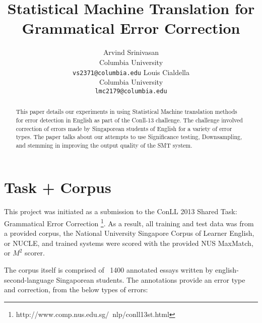 \documentclass[11pt,letterpaper]{article}
\title{Statistical Machine Translation for Grammatical Error Correction}
\author{Arvind Srinivasan\\
	    Columbia University\\
	    {\tt vs2371@columbia.edu}
	  \And
	Louis Cialdella\\
  	Columbia University\\
  {\tt lmc2179@columbia.edu}}
\date{}
\begin{document}
\maketitle
\begin{abstract}
This paper details our experiments in using Statistical Machine translation methods for 
error detection in English as part of the Conll-13 challenge. The challenge involved 
correction of errors made by Singaporean students of English for a variety of error types. 
The paper talks about our attempts to use Significance testing, Downsampling, and stemming in improving
the output quality of the SMT system.
\end{abstract}

\section{Task + Corpus}

This project was initiated as a submission to the ConLL 2013 Shared Task: Grammatical Error Correction \footnote{http://www.comp.nus.edu.sg/~nlp/conll13st.html}. As a result, all training and test data was from a provided corpus, the National University Singapore Corpus of Learner English, or NUCLE, and trained systems were scored with the provided NUS MaxMatch, or $M^2$ scorer. 

The corpus itself is comprised of ~1400 annotated essays written by english-second-language Singaporean students. The annotations provide an error type and correction, from the below types of errors:
\end{document}
